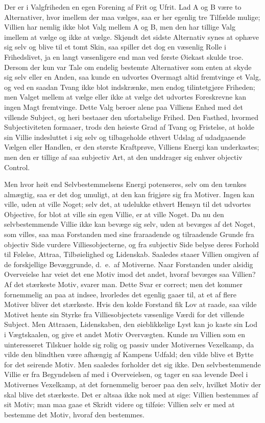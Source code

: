 \documentclass[12pt]{book}
\newcommand{\apage}[1]{\marginnote{\footnotesize\textit{[#1]}}}
\begin{document}
Der er i Valgfriheden en egen Forening af Frit og Ufrit. Lad A og B være to
Alternativer, hvor imellem der maa vælges, saa er her egenlig tre Tilfælde
mulige; Villien har nemlig ikke blot Valg mellem \apage{260} A og B, men den har tillige
Valg imellem at vælge og ikke at vælge. Skjøndt det sidste Alternativ synes at
ophæve sig selv og blive til et tomt Skin, saa spiller det dog en væsenlig
Rolle i Frihedslivet, ja en langt væsenligere end man ved første Øiekast
skulde troe. Dersom der kun var Tale om endelig bestemte Alternativer som
enten at skyde sig selv eller en Anden, saa kunde en udvortes Overmagt altid
fremtvinge et Valg, og ved en saadan Tvang ikke blot indskrænke, men endog
tilintetgjøre Friheden; men Valget mellem at vælge eller ikke at vælge det
udvortes Foreskrevne kan ingen Magt fremtvinge. Dette Valg beroer alene paa
Villiens Enhed med det villende Subject, og heri bestaaer den ufortabelige
Frihed. Den Fasthed, hvormed Subjectiviteten formaaer, trods den høieste Grad
af Tvang og Fristelse, at holde sin Villie indesluttet i sig selv og
tilbageholde ethvert Udslag af udadgaaende Vælgen eller Handlen, er den
største Kraftprøve, Villiens Energi kan underkastes; men den er tillige af saa
subjectiv Art, at den unddrager sig enhver objectiv Control.

Men hvor høit end Selvbestemmelsens Energi potenseres, selv om den tænkes
almægtig, saa er det dog umuligt, at den kan frigjøre sig fra Motiver. Ingen
kan ville, uden at ville Noget; selv det, at udelukke ethvert Hensyn til det
udvortes Objective, for blot at ville sin egen Villie, er at ville Noget. Da
nu den selvbestemmende Villie ikke kan bevæge sig selv, uden at bevæges af det
Noget, som villes, saa maa Forstanden med sine fraraadende og tilraadende
Grunde \apage{261} fra objectiv Side vurdere Villiesobjecterne, og fra subjectiv Side
belyse deres Forhold til Følelse, Attraa, Tilbøielighed og Lidenskab. Saaledes
staaer Villien omgiven af de forskjellige Bevæggrunde, d.\ e.\ af Motiverne.
Naar Forstanden under alsidig Overveielse har veiet det ene Motiv imod det
andet, hvoraf bevæges saa Villien? Af det stærkeste Motiv, svarer man. Dette
Svar er correct; men det kommer fornemmelig an paa at indsee, hvorledes det
egenlig gaaer til, at et af flere Motiver bliver det stærkeste. Hvis den kolde
Forstand fik Lov at raade, saa vilde Motivet hente sin Styrke fra
Villiesobjectets væsenlige Værdi for det villende Subject. Men Attraaen,
Lidenskaben, den øieblikkelige Lyst kan jo kaste sin Lod i Vægtskaalen, og
give et andet Motiv Overvægten. Kunde nu Villien som en uinteresseret
Tilskuer holde sig rolig og passiv under Motivernes Vexelkamp, da vilde den
blindthen være afhængig af Kampens Udfald; den vilde blive et Bytte for det
seirende Motiv. Men saaledes forholder det sig ikke. Den selvbestemmende
Villie er fra Begyndelsen af med i Overveielsen, og tager en saa levende Deel
i Motivernes Vexelkamp, at det fornemmelig beroer paa den selv, hvilket Motiv
der skal blive det stærkeste. Det er altsaa ikke nok med at sige: Villien
bestemmes af sit Motiv; man maa gaae et Skridt videre og tilføie: Villien selv
er med at bestemme det Motiv, hvoraf den bestemmes.
\end{document}
